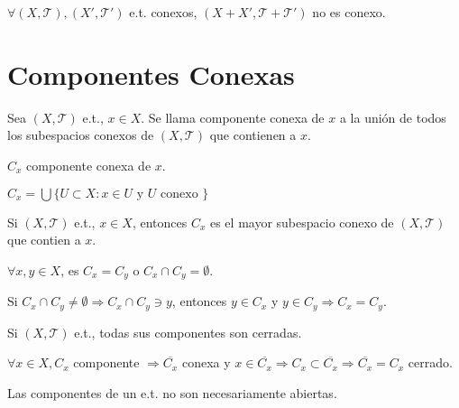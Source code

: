 \begin{obs}
  $\forall ( X, \mathcal{T} ), ( X', \mathcal{T}' )$ e.t. conexos, $( X + X', \mathcal{T} + \mathcal{T}' )$ no es conexo.
\end{obs}

\section{Componentes Conexas}

\begin{defn}
  Sea $( X, \mathcal{T} )$ e.t., $x \in X$. Se llama componente conexa de $x$ a la unión de todos los subespacios conexos de $( X, \mathcal{T} )$ que contienen a $x$.
\end{defn}

\begin{nota}
  $C_{x}$ componente conexa de $x$.
\end{nota}

\begin{obs}
  $C_{x} = \bigcup \{ U \subset X : x \in U \text{ y } U \text{ conexo } \}$
\end{obs}

\begin{obs}
  Si $( X, \mathcal{T} )$ e.t., $x \in X$, entonces $C_{x}$ es el mayor subespacio conexo de $( X, \mathcal{T} )$ que contien a $x$.
\end{obs}

\begin{obs}
  $\forall x, y \in X$, es $C_{x} = C_{y}$ o $C_{x} \cap C_{y} = \emptyset$.
\end{obs}

\begin{dem}
  Si $C_{x} \cap C_{y} \neq \emptyset \Rightarrow C_{x} \cap C_{y} \ni y$, entonces $y \in C_{x}$ y $y \in C_{y} \Rightarrow C_{x} = C_{y}$.
\end{dem}

\begin{prop}
  Si $( X, \mathcal{T} )$ e.t., todas sus componentes son cerradas.
\end{prop}

\begin{dem}
$\forall x \in X, C_{x}$ componente $\Rightarrow \overline{C_{x}}$ conexa y $x \in \overline{C_{x}} \Rightarrow C_{x} \subset \overline{C_{x}} \Rightarrow \overline{C_{x}} = C_{x}$ cerrado.
\end{dem}

\begin{obs}
  Las componentes de un e.t. no son necesariamente abiertas.
\end{obs}

